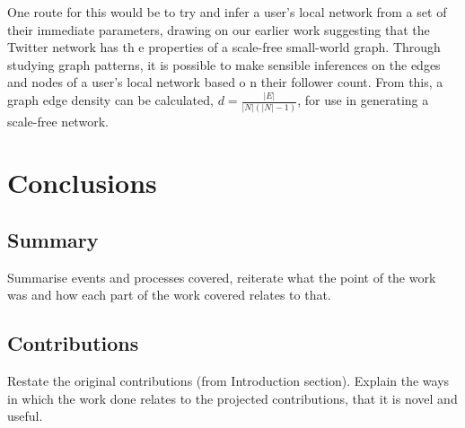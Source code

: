 One route for this would be to try and infer a user's local network from a set of their immediate parameters, drawing on our earlier work suggesting that the Twitter network has th    e properties of a scale-free small-world graph. Through studying graph patterns, it is possible to make sensible inferences on the edges and nodes of a user's local network based o    n their follower count. From this, a graph edge density can be calculated, $ d = \frac{|E|}{|N|(|N|-1)} $, for use in generating a scale-free network.


\section{Conclusions}
\subsection{Summary}
Summarise events and processes covered, reiterate what the point of the work was and how each part of the work covered relates to that.

\subsection{Contributions}
Restate the original contributions (from Introduction section). Explain the ways in which the work done relates to the projected contributions, that it is novel and useful.

